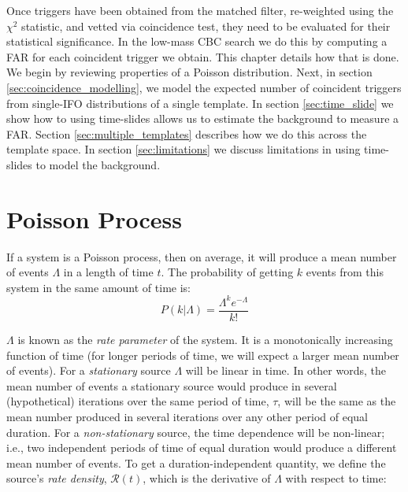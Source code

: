 \def\d{\ensuremath{\,\mathrm{d}}}
\def\RP{\ensuremath{\mathcal{R}}}
\def\tR{\ensuremath{\widetilde{\mathcal{R}}}}
\def\far{\ensuremath{\mathcal{F}}}
\def\rsrc{\ensuremath{\widetilde{r}\,}}
\def\varH{\ensuremath{\mathrm{H}}}
\def\varL{\ensuremath{\mathrm{L}}}
\def\coincT{\ensuremath{\mathfrak{T}}}
\def\vT{\ensuremath{\mathcal{V}}}
\def\Tf{\ensuremath{\mathrm{T_f}}}
\def\th{\ensuremath{^{\mathrm{th}}}}


Once triggers have been obtained from the matched filter, re-weighted using the $\chi^2$ statistic, and vetted via coincidence test, they need to be evaluated for their statistical significance. In the low-mass CBC search we do this by computing a \ac{FAR} for each coincident trigger we obtain. This chapter details how that is done. We begin by reviewing properties of a Poisson distribution. Next, in section \ref{sec:coincidence_modelling}, we model the expected number of coincident triggers from single-\ac{IFO} distributions of a single template. In section \ref{sec:time_slide} we show how to using time-slides allows us to estimate the background to measure a \ac{FAR}. Section \ref{sec:multiple_templates} describes how we do this across the template space. In section \ref{sec:limitations} we discuss limitations in using time-slides to model the background.

\section{Poisson Process}
\label{sec:poisson}
If a system is a Poisson process, then on average, it will produce a mean number of events $\Lambda$ in a length of time $t$. The probability of getting $k$ events from this system in the same amount of time is:
\begin{equation}
\label{eqn:poison}
P(k|\Lambda) = \frac{\Lambda^k e^{-\Lambda}}{k!}
\end{equation}

$\Lambda$ is known as the \emph{rate parameter} of the system. It is a monotonically increasing function of time (for longer periods of time, we will expect a larger mean number of events). For a \emph{stationary} source $\Lambda$ will be linear in time. In other words, the mean number of events a stationary source would produce in several (hypothetical) iterations over the same period of time, $\tau$, will be the same as the mean number produced in several iterations over any other period of equal duration. For a \emph{non-stationary} source, the time dependence will be non-linear; i.e., two independent periods of time of equal duration would produce a different mean number of events. To get a duration-independent quantity, we define the source's \emph{rate density}, $\RP(t)$, which is the derivative of $\Lambda$ with respect to time:

